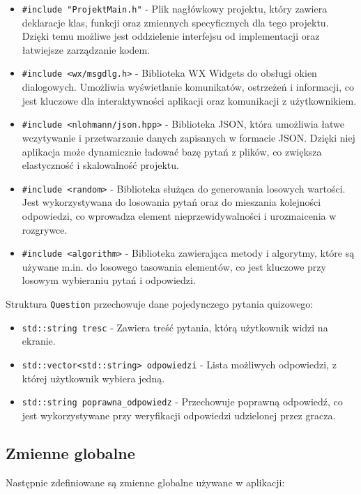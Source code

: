 \documentclass[]{article}
\begin{document}
	\begin{itemize}
	\item \texttt{\#include "ProjektMain.h"} - Plik nagłówkowy projektu, który zawiera deklaracje klas, funkcji oraz zmiennych specyficznych dla tego projektu. Dzięki temu możliwe jest oddzielenie interfejsu od implementacji oraz łatwiejsze zarządzanie kodem.
	\item \texttt{\#include <wx/msgdlg.h>} - Biblioteka WX Widgets do obsługi okien dialogowych. Umożliwia wyświetlanie komunikatów, ostrzeżeń i informacji, co jest kluczowe dla interaktywności aplikacji oraz komunikacji z użytkownikiem.
	\item \texttt{\#include <nlohmann/json.hpp>} - Biblioteka JSON, która umożliwia łatwe wczytywanie i przetwarzanie danych zapisanych w formacie JSON. Dzięki niej aplikacja może dynamicznie ładować bazę pytań z plików, co zwiększa elastyczność i skalowalność projektu.
	\item \texttt{\#include <random>} - Biblioteka służąca do generowania losowych wartości. Jest wykorzystywana do losowania pytań oraz do mieszania kolejności odpowiedzi, co wprowadza element nieprzewidywalności i urozmaicenia w rozgrywce.
	\item \texttt{\#include <algorithm>} - Biblioteka zawierająca metody i algorytmy, które są używane m.in. do losowego tasowania elementów, co jest kluczowe przy losowym wybieraniu pytań i odpowiedzi.
	\end{itemize}
	
	Struktura \texttt{Question} przechowuje dane pojedynczego pytania quizowego:
	
\begin{itemize}
	\item \texttt{std::string tresc} - Zawiera treść pytania, którą użytkownik widzi na ekranie.
	\item \texttt{std::vector<std::string> odpowiedzi} - Lista możliwych odpowiedzi, z której użytkownik wybiera jedną.
	\item \texttt{std::string poprawna\_odpowiedz} - Przechowuje poprawną odpowiedź, co jest wykorzystywane przy weryfikacji odpowiedzi udzielonej przez gracza.
\end{itemize}
	
	\subsection{Zmienne globalne}
	
	Następnie zdefiniowane są zmienne globalne używane w aplikacji:
	
\end{document}
